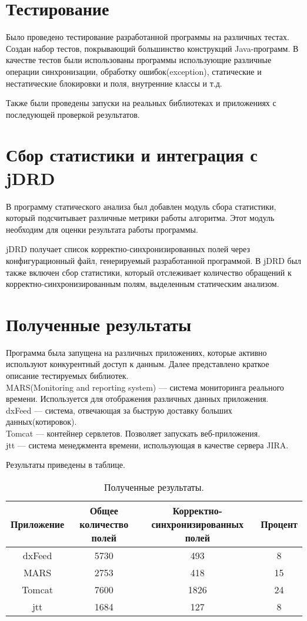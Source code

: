 \FloatBarrier
\section{Тестирование}
Было проведено тестирование разработанной программы на различных тестах. Создан набор тестов, покрывающий большинство конструкций Java-программ. В качестве тестов были использованы программы использующие различные операции синхронизации, обработку ошибок(exception), статические и нестатические блокировки и поля, внутренние классы и т.д.

Также были проведены запуски на реальных библиотеках и приложениях с последующей проверкой результатов.

\FloatBarrier
\section{Сбор статистики и интеграция с jDRD}
В программу статического анализа был добавлен модуль сбора статистики, который подсчитывает различные метрики работы алгоритма. Этот модуль необходим для оценки результата работы программы.

jDRD получает список корректно-синхронизированных полей через конфигурационный файл, генерируемый разработанной программой.
В jDRD был также включен сбор статистики, который отслеживает количество обращений к корректно-синхронизированным полям, выделенным статическим анализом.


\section{Полученные результаты}
Программа была запущена на различных приложениях, которые активно используют конкурентный доступ к данным. 
Далее представлено краткое описание тестируемых библиотек.
\\MARS(Monitoring and reporting system) --- система мониторинга реального времени. Используется для отображения различных данных приложения. 
\\ dxFeed --- система, отвечающая за быструю доставку больших данных(котировок).
\\ Tomcat --- контейнер сервлетов. Позволяет запускать веб-приложения.
\\ jtt --- система менеджмента времени, использующая в качестве сервера JIRA.

Результаты приведены в таблице. 

\begin{table}[H]
\label{results}
\begin{center}
\begin{tabular}{|c|c|c|c|}
\hline
Приложение & Общее количество полей & Корректно-синхронизированных полей & Процент \\
\hline
dxFeed & 5730 & 493 & 8 \\
\hline
MARS & 2753 & 418 & 15 \\
\hline
Tomcat & 7600 & 1826 & 24 \\
\hline
jtt & 1684 & 127 & 8 \\
\hline
\end{tabular}
\captionsetup{justification=centering}
\caption{Полученные результаты.}
\end{center}
\end{table}

